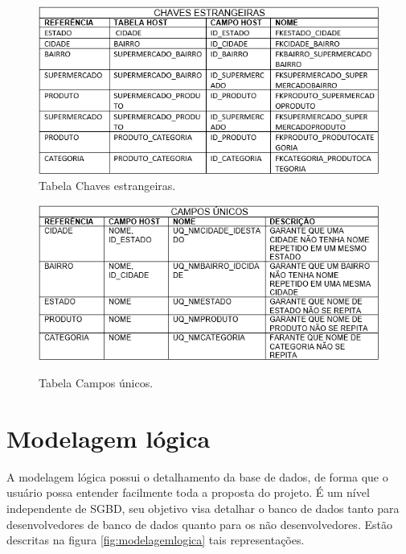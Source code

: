 \begin{figure}[H]
  	\centering
   	\caption{Tabela Chaves estrangeiras.}
   	\includegraphics[scale=0.64]{Imagens/TabelaChavesEstrangeiras.PNG}
\end{figure}
			
\begin{figure}[H]
  	\centering
   	\caption{Tabela Campos únicos.}
   	\includegraphics[scale=0.64]{Imagens/TabelaCamposUnicos.PNG}
   	\label{fig:tabelacamposunicos}
\end{figure}
		

\section{Modelagem lógica}
	A modelagem lógica possui o detalhamento da base de dados, de forma que o usuário possa entender facilmente toda a proposta do projeto. É um nível independente de SGBD, seu objetivo visa detalhar o banco de dados tanto para desenvolvedores de banco de dados quanto para os não desenvolvedores. Estão descritas na figura \ref{fig:modelagemlogica} tais representações.
	
